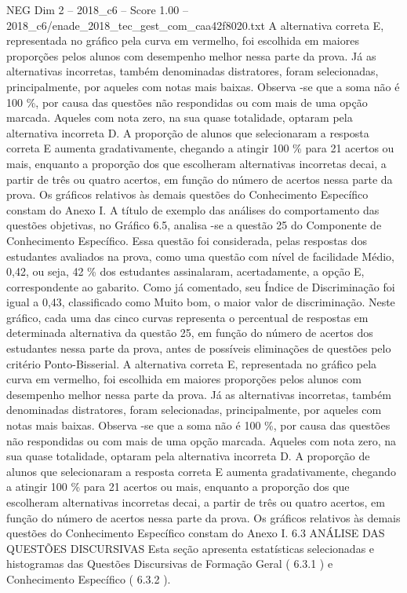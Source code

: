 \begin{textsample}{NEG Dim 2 – 2018\_c6 – Score 1.00 – 2018\_c6/enade\_2018\_tec\_gest\_com\_caa42f8020.txt}
A alternativa correta E, representada no gráfico pela curva em vermelho, foi escolhida em maiores proporções pelos alunos com desempenho melhor nessa parte da prova.
Já as alternativas incorretas, também denominadas distratores, foram selecionadas, principalmente, por aqueles com notas mais baixas.
Observa -se que a soma não é 100 \%, por causa das questões não respondidas ou com mais de uma opção marcada.
Aqueles com nota zero, na sua quase totalidade, optaram pela alternativa incorreta D.
A proporção de alunos que selecionaram a resposta correta E aumenta gradativamente, chegando a atingir 100 \% para 21 acertos ou mais, enquanto a proporção dos que escolheram alternativas incorretas decai, a partir de três ou quatro acertos, em função do número de acertos nessa parte da prova.
Os gráficos relativos às demais questões do Conhecimento Específico constam do Anexo I.
A título de exemplo das análises do comportamento das questões objetivas, no Gráfico 6.5, analisa -se a questão 25 do Componente de Conhecimento Específico.
Essa questão foi considerada, pelas respostas dos estudantes avaliados na prova, como uma questão com nível de facilidade Médio, 0,42, ou seja, 42 \% dos estudantes assinalaram, acertadamente, a opção E, correspondente ao gabarito.
Como já comentado, seu Índice de Discriminação foi igual a 0,43, classificado como Muito bom, o maior valor de discriminação.
Neste gráfico, cada uma das cinco curvas representa o percentual de respostas em determinada alternativa da questão 25, em função do número de acertos dos estudantes nessa parte da prova, antes de possíveis eliminações de questões pelo critério Ponto-Bisserial.
A alternativa correta E, representada no gráfico pela curva em vermelho, foi escolhida em maiores proporções pelos alunos com desempenho melhor nessa parte da prova.
Já as alternativas incorretas, também denominadas distratores, foram selecionadas, principalmente, por aqueles com notas mais baixas.
Observa -se que a soma não é 100 \%, por causa das questões não respondidas ou com mais de uma opção marcada.
Aqueles com nota zero, na sua quase totalidade, optaram pela alternativa incorreta D.
A proporção de alunos que selecionaram a resposta correta E aumenta gradativamente, chegando a atingir 100 \% para 21 acertos ou mais, enquanto a proporção dos que escolheram alternativas incorretas decai, a partir de três ou quatro acertos, em função do número de acertos nessa parte da prova.
Os gráficos relativos às demais questões do Conhecimento Específico constam do Anexo I. 6.3 ANÁLISE DAS QUESTÕES DISCURSIVAS Esta seção apresenta estatísticas selecionadas e histogramas das Questões Discursivas de Formação Geral ( 6.3.1 ) e Conhecimento Específico ( 6.3.2 ).

\end{textsample}
